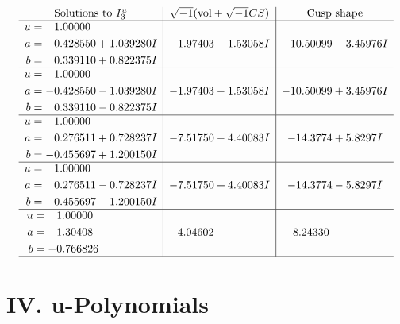 \documentclass[1p]{elsarticle_modified}
\theoremstyle{definition}
\newcommand{\I}{\sqrt{-1}}
\begin{document}
$$\begin{array}{c|c|c}  
\text{Solutions to }I^u_{3}& \I (\text{vol} + \sqrt{-1}CS) & \text{Cusp shape}\\
 \hline 
\begin{aligned}
u &= \phantom{-}1.00000\phantom{ +0.000000I} \\
a &= -0.428550 + 1.039280 I \\
b &= \phantom{-}0.339110 + 0.822375 I\end{aligned}
 & -1.97403 + 1.53058 I & -10.50099 - 3.45976 I \\ \hline\begin{aligned}
u &= \phantom{-}1.00000\phantom{ +0.000000I} \\
a &= -0.428550 - 1.039280 I \\
b &= \phantom{-}0.339110 - 0.822375 I\end{aligned}
 & -1.97403 - 1.53058 I & -10.50099 + 3.45976 I \\ \hline\begin{aligned}
u &= \phantom{-}1.00000\phantom{ +0.000000I} \\
a &= \phantom{-}0.276511 + 0.728237 I \\
b &= -0.455697 + 1.200150 I\end{aligned}
 & -7.51750 - 4.40083 I & -14.3774 + 5.8297 I \\ \hline\begin{aligned}
u &= \phantom{-}1.00000\phantom{ +0.000000I} \\
a &= \phantom{-}0.276511 - 0.728237 I \\
b &= -0.455697 - 1.200150 I\end{aligned}
 & -7.51750 + 4.40083 I & -14.3774 - 5.8297 I \\ \hline\begin{aligned}
u &= \phantom{-}1.00000\phantom{ +0.000000I} \\
a &= \phantom{-}1.30408\phantom{ +0.000000I} \\
b &= -0.766826\phantom{ +0.000000I}\end{aligned}
 & -4.04602\phantom{ +0.000000I} & -8.24330\phantom{ +0.000000I}\\
 \hline 
 \end{array}$$\newpage
\newpage\renewcommand{\arraystretch}{1}
\centering \section*{ IV. u-Polynomials}
\end{document}
